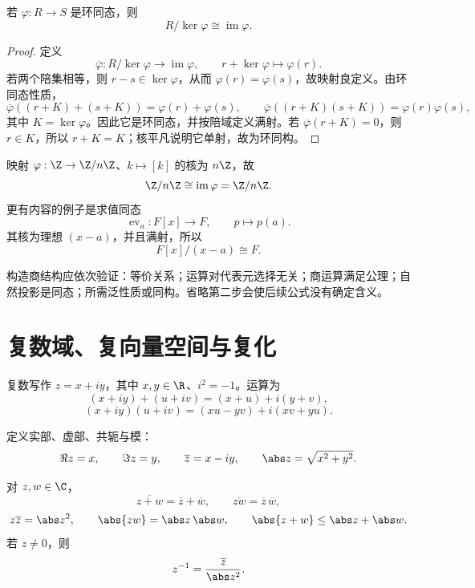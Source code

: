 \begin{theorem}[环的第一同构定理]
若 \(\varphi:R\to S\) 是环同态，则
\[
 R/\ker\varphi\cong\operatorname{im}\varphi.
\]
\end{theorem}

\begin{proof}
定义
\[
 \overline\varphi:R/\ker\varphi\longrightarrow\operatorname{im}\varphi,
 \qquad r+\ker\varphi\longmapsto\varphi(r).
\]
若两个陪集相等，则 \(r-s\in\ker\varphi\)，从而 \(\varphi(r)=\varphi(s)\)，故映射良定义。由环同态性质，
\[
 \overline\varphi((r+K)+(s+K))=\varphi(r)+\varphi(s),
 \qquad
 \overline\varphi((r+K)(s+K))=\varphi(r)\varphi(s),
\]
其中 \(K=\ker\varphi\)。因此它是环同态，并按陪域定义满射。若 \(\overline\varphi(r+K)=0\)，则 \(r\in K\)，所以 \(r+K=K\)；核平凡说明它单射，故为环同构。
\end{proof}

\begin{example}
映射 \(\varphi:\Z\to\Z/n\Z\)、\(k\mapsto[k]\) 的核为 \(n\Z\)，故
\[
 \Z/n\Z\cong\operatorname{im}\varphi=\Z/n\Z.
\]
更有内容的例子是求值同态
\[
 \operatorname{ev}_a:F[x]\to F,\qquad p\mapsto p(a).
\]
其核为理想 \((x-a)\)，并且满射，所以
\[
 F[x]/(x-a)\cong F.
\]
\end{example}

\begin{remark}[商对象的核对顺序]
构造商结构应依次验证：等价关系；运算对代表元选择无关；商运算满足公理；自然投影是同态；所需泛性质或同构。省略第二步会使后续公式没有确定含义。
\end{remark}

\section{复数域、复向量空间与复化}

\begin{definition}[复数]
复数写作 \(z=x+iy\)，其中 \(x,y\in\R\)、\(i^2=-1\)。运算为
\[
 (x+iy)+(u+iv)=(x+u)+i(y+v),
\]
\[
 (x+iy)(u+iv)=(xu-yv)+i(xv+yu).
\]
\end{definition}

定义实部、虚部、共轭与模：
\[
 \Re z=x,\qquad \Im z=y,\qquad
 \overline z=x-iy,\qquad
 \abs z=\sqrt{x^2+y^2}.
\]

\begin{proposition}
对 \(z,w\in\C\)，
\[
 \overline{z+w}=\overline z+\overline w,\qquad
 \overline{zw}=\overline z\,\overline w,
\]
\[
 z\overline z=\abs z^2,\qquad
 \abs{zw}=\abs z\,\abs w,\qquad
 \abs{z+w}\le\abs z+\abs w.
\]
若 \(z\ne0\)，则
\[
 z^{-1}=\frac{\overline z}{\abs z^2}.
\]
\end{proposition}

